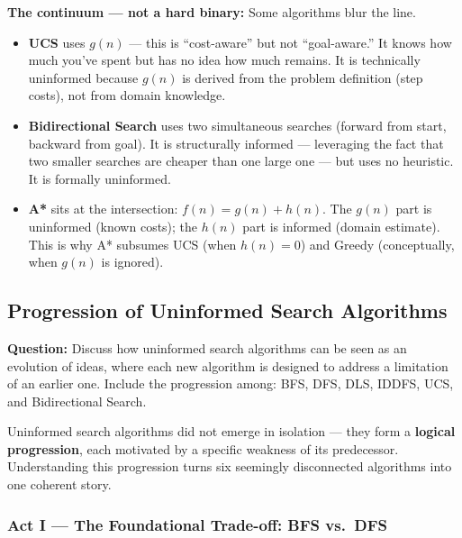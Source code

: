 \documentclass[12pt, a4paper]{article}
\newenvironment{solutionbox}{\begin{mdframed}[style=solutionframe]}{\end{mdframed}}
\begin{document}
\vspace{0.4em}

\noindent\textbf{The continuum — not a hard binary:} Some algorithms blur the line.
\begin{itemize}[leftmargin=1.5cm, itemsep=2pt, topsep=3pt]
  \item \textbf{UCS} uses $g(n)$ — this is ``cost-aware'' but not ``goal-aware.'' It knows how much you've spent but has no idea how much remains. It is technically uninformed because $g(n)$ is derived from the problem definition (step costs), not from domain knowledge.
  \item \textbf{Bidirectional Search} uses two simultaneous searches (forward from start, backward from goal). It is structurally informed — leveraging the fact that two smaller searches are cheaper than one large one — but uses no heuristic. It is formally uninformed.
  \item \textbf{A*} sits at the intersection: $f(n) = g(n) + h(n)$. The $g(n)$ part is uninformed (known costs); the $h(n)$ part is informed (domain estimate). This is why A* subsumes UCS (when $h(n){=}0$) and Greedy (conceptually, when $g(n)$ is ignored).
\end{itemize}

\subsection{Progression of Uninformed Search Algorithms}

\begin{solutionbox}
\textbf{Question:} Discuss how uninformed search algorithms can be seen as an evolution of ideas, where each new algorithm is designed to address a limitation of an earlier one. Include the progression among: BFS, DFS, DLS, IDDFS, UCS, and Bidirectional Search.
\end{solutionbox}

\vspace{0.5em}

\noindent Uninformed search algorithms did not emerge in isolation — they form a \textbf{logical progression}, each motivated by a specific weakness of its predecessor. Understanding this progression turns six seemingly disconnected algorithms into one coherent story.

\subsubsection*{Act I — The Foundational Trade-off: BFS vs.\ DFS}
\end{document}
